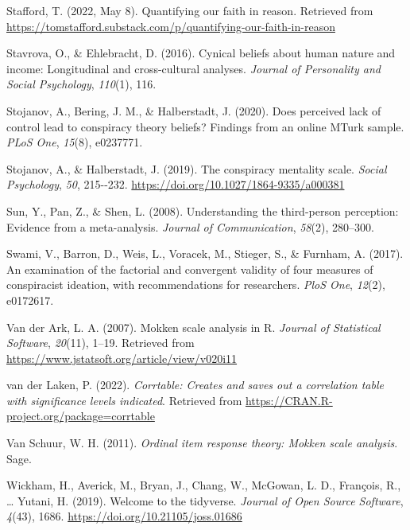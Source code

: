 \documentclass[
  ,jou,floatsintext]{apa6}
\newlength{\cslhangindent}
\newlength{\cslentryspacingunit} %
\newenvironment{CSLReferences}[2] %
 {%
  \setlength{\parindent}{0pt}
  \ifodd #1
  \let\oldpar\par
  \def\par{\hangindent=\cslhangindent\oldpar}
  \fi
  \setlength{\parskip}{#2\cslentryspacingunit}
 }%
 {}
\begin{document}
\begin{CSLReferences}{1}{0}
\leavevmode{}%
Stafford, T. (2022, May 8). Quantifying our faith in reason. Retrieved from \url{https://tomstafford.substack.com/p/quantifying-our-faith-in-reason}

\leavevmode{}%
Stavrova, O., \& Ehlebracht, D. (2016). Cynical beliefs about human nature and income: Longitudinal and cross-cultural analyses. \emph{Journal of Personality and Social Psychology}, \emph{110}(1), 116.

\leavevmode{}%
Stojanov, A., Bering, J. M., \& Halberstadt, J. (2020). Does perceived lack of control lead to conspiracy theory beliefs? Findings from an online MTurk sample. \emph{PLoS One}, \emph{15}(8), e0237771.

\leavevmode{}%
Stojanov, A., \& Halberstadt, J. (2019). The conspiracy mentality scale. \emph{Social Psychology}, \emph{50}, 215-\/-232. \url{https://doi.org/10.1027/1864-9335/a000381}

\leavevmode{}%
Sun, Y., Pan, Z., \& Shen, L. (2008). Understanding the third-person perception: Evidence from a meta-analysis. \emph{Journal of Communication}, \emph{58}(2), 280--300.

\leavevmode{}%
Swami, V., Barron, D., Weis, L., Voracek, M., Stieger, S., \& Furnham, A. (2017). An examination of the factorial and convergent validity of four measures of conspiracist ideation, with recommendations for researchers. \emph{PloS One}, \emph{12}(2), e0172617.

\leavevmode{}%
Van der Ark, L. A. (2007). Mokken scale analysis in {R}. \emph{Journal of Statistical Software}, \emph{20}(11), 1--19. Retrieved from \url{https://www.jstatsoft.org/article/view/v020i11}

\leavevmode{}%
van der Laken, P. (2022). \emph{Corrtable: Creates and saves out a correlation table with significance levels indicated}. Retrieved from \url{https://CRAN.R-project.org/package=corrtable}

\leavevmode{}%
Van Schuur, W. H. (2011). \emph{Ordinal item response theory: Mokken scale analysis}. Sage.

\leavevmode{}%
Wickham, H., Averick, M., Bryan, J., Chang, W., McGowan, L. D., François, R., \ldots{} Yutani, H. (2019). Welcome to the {tidyverse}. \emph{Journal of Open Source Software}, \emph{4}(43), 1686. \url{https://doi.org/10.21105/joss.01686}


\end{CSLReferences}
\end{document}
